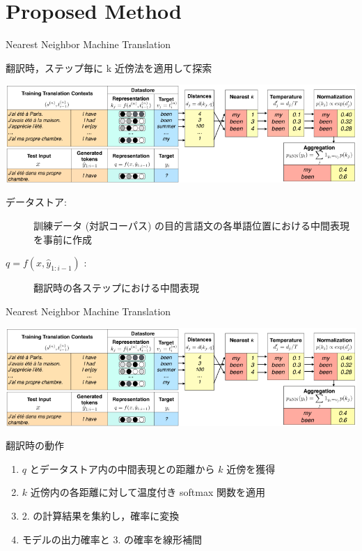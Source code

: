 \documentclass[unicode, 12pt, xdvipdfmx, aspectratio=43]{beamer}
\renewcommand{\baselinestretch}{1.3}
\begin{document}
\section{Proposed Method}
\label{sec:orge527d37}
\begin{frame}[label={sec:org927cd44}]{Nearest Neighbor Machine Translation}
\begin{block}{翻訳時，ステップ毎に k 近傍法を適用して探索}
\begin{center}
\includegraphics[width=\linewidth]{./figure/Figure1.pdf}
\end{center}

\begin{description}
\item[{データストア:}] 訓練データ (対訳コーパス) の目的言語文の各単語位置における中間表現を事前に作成
\item[{\(q = f(x, \hat{y}_{1:i-1})\) :}] 翻訳時の各ステップにおける中間表現
\end{description}
\end{block}
\end{frame}

\begin{frame}[label={sec:orge2d1e55}]{Nearest Neighbor Machine Translation}
\begin{center}
\includegraphics[width=\linewidth]{./figure/Figure1.pdf}
\end{center}
\renewcommand{\baselinestretch}{1.0}
\small
\begin{block}{翻訳時の動作}
\begin{enumerate}
\item \(q\) とデータストア内の中間表現との距離から \(k\) 近傍を獲得
\item \(k\) 近傍内の各距離に対して温度付き softmax 関数を適用
\item 2. の計算結果を集約し，確率に変換
\item モデルの出力確率と 3. の確率を線形補間
\end{enumerate}

\renewcommand{\baselinestretch}{1.3}
\end{block}
\end{frame}
\end{document}
